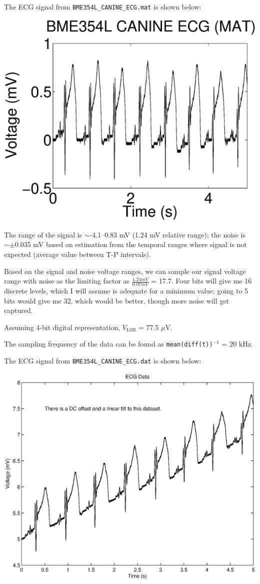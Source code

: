 \item The ECG signal from {\tt BME354L\_CANINE\_ECG.mat} is shown below:

\begin{center}
\includegraphics[width=0.5\linewidth]{ecg_data/ecg_mat.eps}
\end{center}

The range of the signal is $\sim$-4.1--0.83 mV (1.24
mV relative range); the noise is $\sim \pm$0.035 mV based on estimation from the
temporal ranges where signal is not expected (average value between T-P
intervals).


Based on the signal and noise voltage ranges, we can sample our signal
voltage range with noise as the limiting factor as $\frac{1.24 mV}{0.07 mV}$ =
17.7.  Four bits will give me 16 discrete levels, which I will assume is
adequate for a minimum value; going to 5 bits would give me 32, which would be
better, though more noise will get captured.

Assuming 4-bit digital representation, $V_\textrm{LSB}$ = 77.5 $\mu$V.

The sampling frequency of the data can be found as {\tt mean(diff(t))}$^{-1}$ = 20 kHz.

The ECG signal from {\tt BME354L\_CANINE\_ECG.dat} is shown below:

\begin{center}
\includegraphics[width=0.5\linewidth]{ecg_data/ecg_dat.eps}
\end{center}

